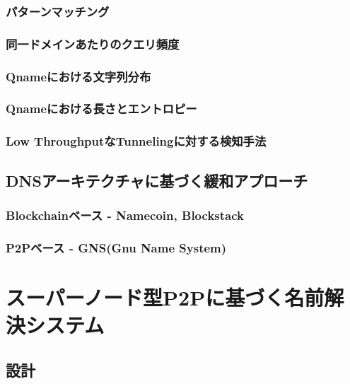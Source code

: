 \documentclass[12pt]{jarticle} %
\begin{document}
\subsubsection{パターンマッチング}
\subsubsection{同一ドメインあたりのクエリ頻度}
\subsubsection{Qnameにおける文字列分布}
\subsubsection{Qnameにおける長さとエントロピー}
\subsubsection{Low ThroughputなTunnelingに対する検知手法}
\subsection{DNSアーキテクチャに基づく緩和アプローチ}
\subsubsection{Blockchainベース - Namecoin, Blockstack}
\subsubsection{P2Pベース - GNS(Gnu Name System)}



\newpage
\section{スーパーノード型P2Pに基づく名前解決システム}
\subsection{設計}
\end{document}
